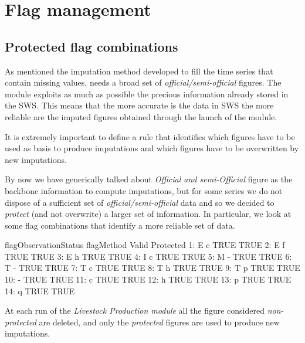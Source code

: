 \documentclass[nojss]{jss}
\begin{document}
\section{Flag management}

\subsection{Protected flag combinations}
As mentioned the imputation method developed to fill the time series that contain missing values, needs a broad set of \textit{official/semi-official} figures. The module exploits as much as possible the precious information already stored in the SWS. This means that the more accurate is the data in SWS the more reliable are the imputed figures obtained through the launch of the module.

It is extremely important to define a rule that identifies which figures have to be used as basis to produce imputations and which figures have to be overwritten by new imputations.

By now we have generically talked about \textit{Official and semi-Official} figure as the backbone information to compute imputations, but for some series we do not dispose of a sufficient set of \textit{official/semi-official} data and so we decided to \textit{protect} (and not overwrite) a larger set of information. In particular, we look at some flag combinations that identify a more reliable set of data.


\begin{Schunk}
\begin{Soutput}
    flagObservationStatus flagMethod Valid Protected
 1:                     E          c  TRUE      TRUE
 2:                     E          f  TRUE      TRUE
 3:                     E          h  TRUE      TRUE
 4:                     I          c  TRUE      TRUE
 5:                     M          -  TRUE      TRUE
 6:                     T          -  TRUE      TRUE
 7:                     T          c  TRUE      TRUE
 8:                     T          h  TRUE      TRUE
 9:                     T          p  TRUE      TRUE
10:                                -  TRUE      TRUE
11:                                c  TRUE      TRUE
12:                                h  TRUE      TRUE
13:                                p  TRUE      TRUE
14:                                q  TRUE      TRUE
\end{Soutput}
\end{Schunk}

At each run of the \textit{Livestock Production module} all the figure considered \textit{non-protected} are deleted, and only the \textit{protected} figures are used to produce new imputations.
\end{document}
